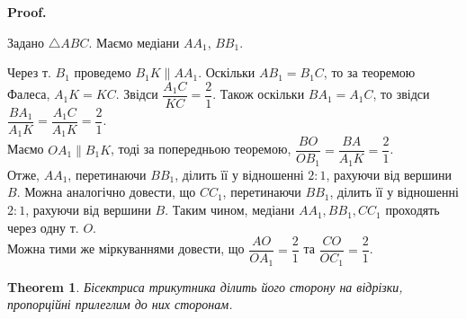 \documentclass[a4paper, 10pt]{article}
\makeatletter
\def\qed{$\blacksquare$}
\theoremstyle{theoremdd}
\newtheorem{theorem}{Theorem}[subsection]
\theoremstyle{theoremdd}
\theoremstyle{theoremdd}
\theoremstyle{theoremdd}
\theoremstyle{theoremdd}
\theoremstyle{theoremdd}
\theoremstyle{theoremdd}
\theoremstyle{theoremdd}
\theoremstyle{theoremdd}
\renewenvironment{proof}[1][Proof.\\]{\par
\pushQED{\hfill \qed}%
\normalfont \topsep6\p@\@plus6\p@\relax
\trivlist
\item\relax
{\bfseries
#1\@addpunct{.}}\hspace\labelsep\ignorespaces
}{%
\popQED\endtrivlist\@endpefalse
}
\makeatother
\begin{document}
\begin{proof}
Задано $\triangle ABC$. Маємо медіани $AA_1$, $BB_1$.
\begin{figure}[H]
\centering
{}
\end{figure}
Через т. $B_1$ проведемо $B_1K \parallel AA_1$. Оскільки $AB_1 = B_1C$, то за теоремою Фалеса, $A_1K = KC$. Звідси $\dfrac{A_1C}{KC} = \dfrac{2}{1}$. Також оскільки $BA_1 = A_1C$, то звідси $\dfrac{BA_1}{A_1K} = \dfrac{A_1C}{A_1K} = \dfrac{2}{1}$.\\
Маємо $OA_1 \parallel B_1K$, тоді за попередньою теоремою, $\dfrac{BO}{OB_1} = \dfrac{BA}{A_1K} = \dfrac{2}{1}$.\\
Отже, $AA_1$, перетинаючи $BB_1$, ділить її у відношенні $2 : 1$, рахуючи від вершини $B$. Можна аналогічно довести, що $CC_1$, перетинаючи $BB_1$, ділить її у відношенні $2 : 1$, рахуючи від вершини $B$. Таким чином, медіани $AA_1,BB_1,CC_1$ проходять через одну т. $O$.
\bigskip \\
Можна тими же міркуваннями довести, що $\dfrac{AO}{OA_1} = \dfrac{2}{1}$ та $\dfrac{CO}{OC_1} = \dfrac{2}{1}$.
\end{proof}

\begin{theorem}
Бісектриса трикутника ділить його сторону на відрізки, пропорційні прилеглим до них сторонам.
\end{theorem}
\end{document}
